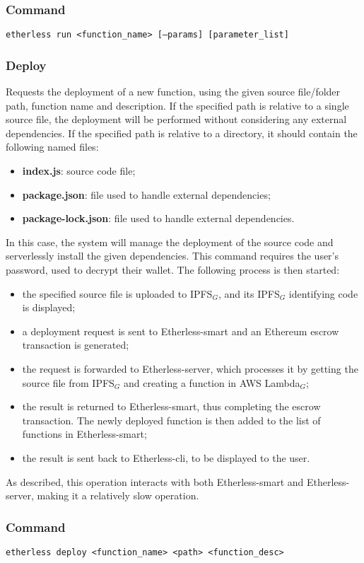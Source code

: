 	\subsubsection*{Command}
	\texttt{etherless run <function\_name> [---params] [parameter\_list]}
	\subsubsection{Deploy}
	Requests the deployment of a new function, using the given source file/folder path, function name and description. If the specified path is relative to a single source file, the deployment will be performed without considering any external dependencies. If the specified path is relative to a directory, it should contain the following named files:
	\begin{itemize}
		\item \textbf{index.js}: source code file;
		\item \textbf{package.json}: file used to handle external dependencies;
		\item \textbf{package-lock.json}: file used to handle external dependencies.
	\end{itemize}
	In this case, the system will manage the deployment of the source code and serverlessly install the given dependencies.
	This command requires the user's password, used to decrypt their wallet. The following process is then started:
	\begin{itemize}
		\item the specified source file is uploaded to IPFS$_{G}$, and its IPFS$_{G}$ identifying code is displayed;
		\item a deployment request is sent to Etherless-smart and an Ethereum escrow transaction is generated;
		\item the request is forwarded to Etherless-server, which processes it by getting the source file from IPFS$_{G}$ and creating a function in AWS Lambda$_{G}$;
		\item the result is returned to Etherless-smart, thus completing the escrow transaction. The newly deployed function is then added to the list of functions in Etherless-smart;
		\item the result is sent back to Etherless-cli, to be displayed to the user.
	\end{itemize}
	As described, this operation interacts with both Etherless-smart and Etherless-server, making it a relatively slow operation.
	\subsubsection*{Command}
	\texttt{etherless deploy <function\_name> <path>  <function\_desc>}
